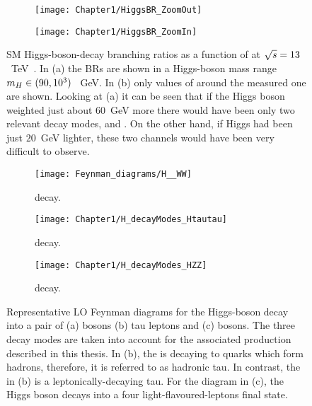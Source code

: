 \begin{figure}[h]
\centering
\begin{subfigure}{.5\textwidth}
  \centering
  \texttt{[image: Chapter1/HiggsBR\_ZoomOut]}
  \caption{}
  \label{fig:Chap1:Higgs:BR:Out}
\end{subfigure}%
\begin{subfigure}{.5\textwidth}
  \centering
  \texttt{[image: Chapter1/HiggsBR\_ZoomIn]}
  \caption{}
  \label{fig:Chap1:Higgs:BR:In}
\end{subfigure}
\caption{SM Higgs-boson-decay branching ratios as a function of \mH at $\sqrt{s}=13$~TeV~\cite{LHCHiggsCrossSectionWorkingGroup:2016ypw}. In (a) the BRs are shown in a Higgs-boson mass 
range $m_{H} \in (90, 10^3)$~ GeV. In (b) only values of \mH around the measured one are shown.
 Looking at (a) it can be seen that if the Higgs boson
weighted just about $60$~GeV more there would have been only two relevant decay 
modes, \HWW and \HZZ. On the other hand, if Higgs had been just $20$~GeV lighter, these
two channels would have been very difficult to observe.}
\label{fig:Chap1:Higgs:BR}
\end{figure} %

\begin{figure}[h]
\centering
\begin{subfigure}{.25\textwidth}
  \centering
  \texttt{[image: Feynman\_diagrams/H\_\_WW]}
  \caption{\HWW decay.}
  \label{fig:Chap1:Higgs:DecayModes:HWW}
\end{subfigure}%
\begin{subfigure}{.34\textwidth}
  \centering
  \texttt{[image: Chapter1/H\_decayModes\_Htautau]}
  \caption{\Htautau decay.}
  \label{fig:Chap1:Higgs:DecayModes:Htautau}
\end{subfigure}%
\begin{subfigure}{.32\textwidth}
  \centering
  \texttt{[image: Chapter1/H\_decayModes\_HZZ]}
  \caption{\HZZ decay.}
  \label{fig:Chap1:Higgs:DecayModes:HZZ}
\end{subfigure}
\caption{Representative LO Feynman diagrams for the Higgs-boson decay into a pair of (a) \PW bosons
(b) tau leptons and (c) \PZ bosons. 
The three decay modes are taken into account for the associated \tHq production described in this thesis.
In (b), the \APtauon is decaying to quarks which form hadrons, 
therefore, it is referred to as hadronic tau. In contrast, the \Ptauon in (b) is a leptonically-decaying tau. 
For the diagram in (c), the Higgs boson decays into a four light-flavoured-leptons final state.}
\label{fig:Chap1:Higgs:DecayModes}
\end{figure}

